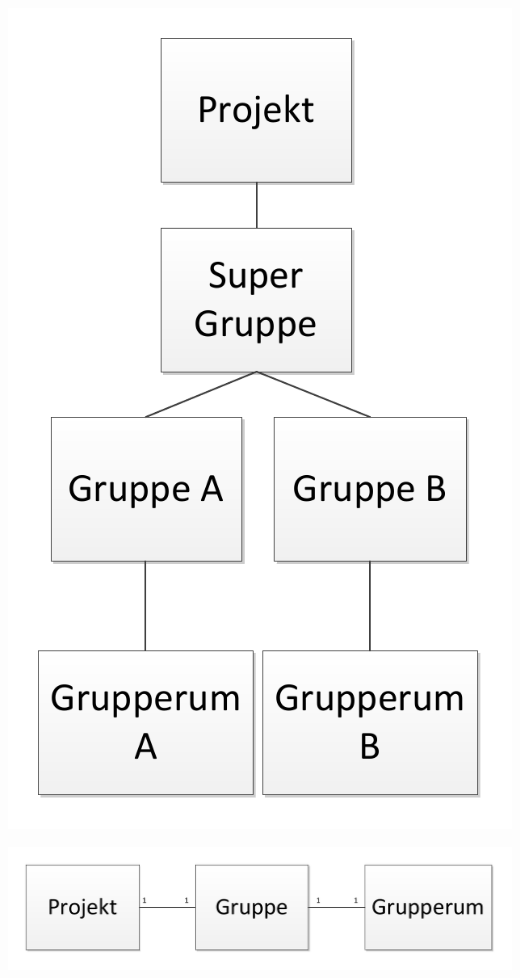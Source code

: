 \begin{frame}{\topictwo} 
\includegraphics[width=\columnwidth]{input/rasmus/topictwo6.pdf}
\end{frame}
\begin{frame}{\topictwo} 
\includegraphics[width=\columnwidth]{input/rasmus/topictwo7.pdf}
\end{frame}
